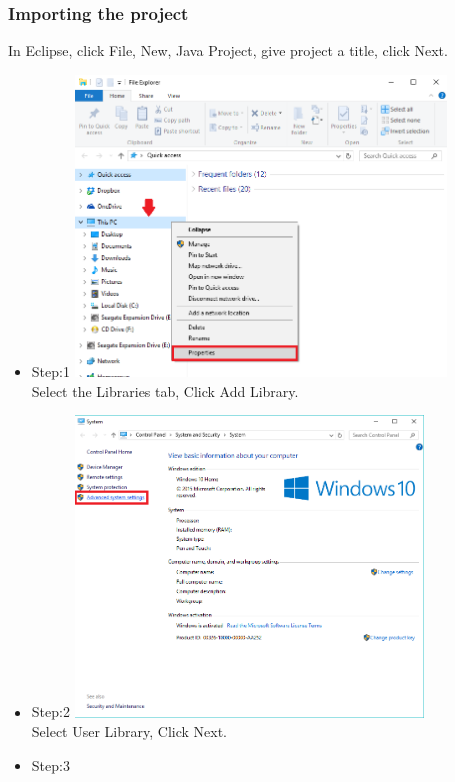 \documentclass[a4paper,12pt]{report}
\begin{document}
	\subsubsection{Importing the project}
	In Eclipse, click File, New, Java Project, give project a title, click Next. \newline\newline
	
	\begin{itemize}
		\item Step:1	\linebreak
		\includegraphics[height=8cm]{../Images/001.png}\\
		\linebreak
		Select the Libraries tab, Click Add Library.
		\pagebreak
		\item Step:2	\linebreak
		\includegraphics[height=8cm]{../Images/002.png}\\ 
		\linebreak 
		Select User Library, Click Next.
		\item Step:3	\linebreak

\end{itemize}
\end{document}
